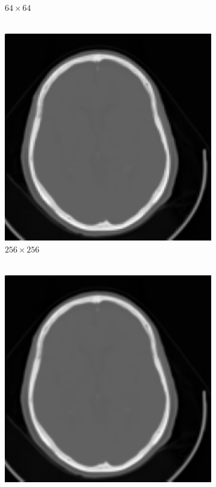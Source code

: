 \documentclass[11pt,twocolumn,twoside]{opticajnl}
\begin{document}
\begin{figure}[h]
\begin{subfigure}[h]{0.24\linewidth}
            \caption{$64\times64$ \\
            $~$} 
         \end{subfigure}
         \begin{subfigure}[h]{0.24\linewidth}
            \centering
            \includegraphics[width=\textwidth]{Figuras/Interpolate_bilinear_f=2.png}
            \caption{$256\times256$ \\
            $~$} 
         \end{subfigure}
         \begin{subfigure}[h]{0.24\linewidth}
            \centering
            \includegraphics[width=\textwidth]{Figuras/Interpolate_bilinear_f=8.png}

\end{subfigure}
\end{figure}
\end{document}
